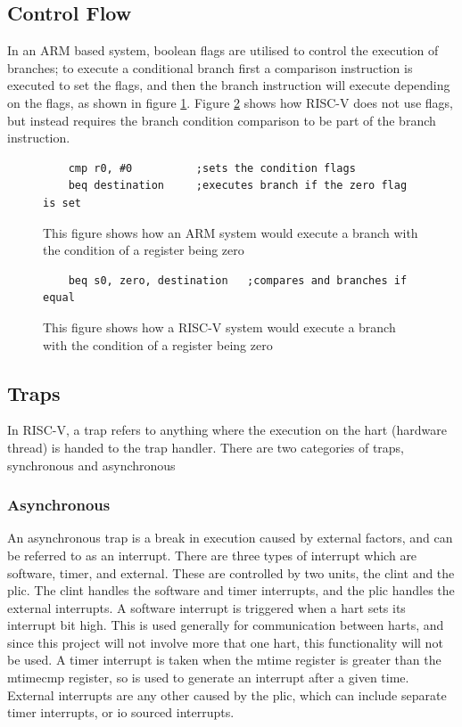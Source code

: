 \subsection{Control Flow}
In an ARM based system, boolean flags are utilised to control the execution of branches; to execute a conditional branch first a comparison instruction is executed to set the flags, and then the branch instruction will execute depending on the flags, as shown in figure \ref{fig:arm_branch}. Figure \ref{fig:riscv_branch} shows how RISC-V does not use flags, but instead requires the branch condition comparison to be part of the branch instruction.
\begin{figure}[H]
\begin{verbatim}
    cmp r0, #0          ;sets the condition flags
    beq destination     ;executes branch if the zero flag is set
\end{verbatim}
\caption[ARM branching code]{This figure shows how an ARM system would execute a branch with the condition of a register being zero}
\label{fig:arm_branch}
\end{figure}
\begin{figure}[H]
\begin{verbatim}
    beq s0, zero, destination   ;compares and branches if equal
\end{verbatim}
\caption[RISC-V branching code]{This figure shows how a RISC-V system would execute a branch with the condition of a register being zero}
\label{fig:riscv_branch}
\end{figure}
\subsection{Traps}
In RISC-V, a trap refers to anything where the execution on the hart (hardware thread) is handed to the trap handler. There are two categories of traps, synchronous and asynchronous
\subsubsection{Asynchronous}
An asynchronous trap is a break in execution caused by external factors, and can be referred to as an interrupt. There are three types of interrupt which are software, timer, and external. These are controlled by two units, the \ac{clint} and the \ac{plic}. The \ac{clint} handles the software and timer interrupts, and the \ac{plic} handles the external interrupts. A software interrupt is triggered when a hart sets its interrupt bit high. This is used generally for communication between harts, and since this project will not involve more that one hart, this functionality will not be used. A timer interrupt is taken when the mtime register is greater than the mtimecmp register, so is used to generate an interrupt after a given time. External interrupts are any other caused by the \ac{plic}, which can include separate timer interrupts, or \ac{io} sourced interrupts\cite{sifive_manual}.

